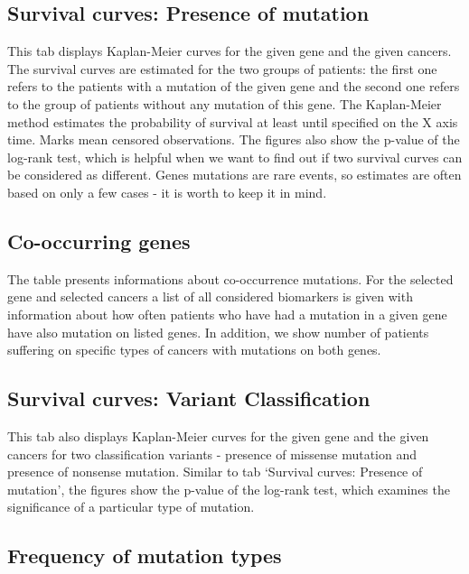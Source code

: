 \subsection{Survival curves: Presence of
mutation}\label{survival-curves-presence-of-mutation}

This tab displays Kaplan-Meier curves for the given gene and the given
cancers. The survival curves are estimated for the two groups of
patients: the first one refers to the patients with a mutation of the
given gene and the second one refers to the group of patients without
any mutation of this gene. The Kaplan-Meier method estimates the
probability of survival at least until specified on the X axis time.
Marks mean censored observations. The figures also show the p-value of
the log-rank test, which is helpful when we want to find out if two
survival curves can be considered as different. Genes mutations are rare
events, so estimates are often based on only a few cases - it is worth
to keep it in mind.

\subsection{Co-occurring genes}\label{co-occurring-genes}

The table presents informations about co-occurrence mutations. For the
selected gene and selected cancers a list of all considered biomarkers
is given with information about how often patients who have had a
mutation in a given gene have also mutation on listed genes. In
addition, we show number of patients suffering on specific types of
cancers with mutations on both genes.

\subsection{Survival curves: Variant
Classification}\label{survival-curves-variant-classification}

This tab also displays Kaplan-Meier curves for the given gene and the
given cancers for two classification variants - presence of missense
mutation and presence of nonsense mutation. Similar to tab `Survival
curves: Presence of mutation', the figures show the p-value of the
log-rank test, which examines the significance of a particular type of
mutation.

\subsection{Frequency of mutation
types}\label{frequency-of-mutation-types}

